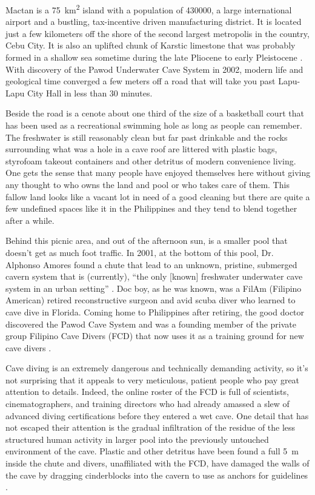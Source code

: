 
Mactan is a \SI{75}{\kilo\metre\squared} island with a population of \num{430000}, a large international airport and a bustling, tax-incentive driven manufacturing district. It is located just a few kilometers off the shore of the second largest metropolis in the country, Cebu City. 
It is also an uplifted chunk of Karstic limestone that was probably formed in a shallow sea sometime during the late Pliocene to early Pleistocene \parencite{Aleta_2003}. With discovery of the Pawod Underwater Cave System in 2002, modern life and geological time converged a few meters off a road that will take you past Lapu-Lapu City Hall in less than 30 minutes.

Beside the road is a cenote about one third of the size of a basketball court that has been used as a recreational swimming hole as long as people can remember. The freshwater is still reasonably clean but far past drinkable and the rocks surrounding what was a hole in a cave roof are littered with plastic bags, styrofoam takeout containers and other detritus of modern convenience living. One gets the sense that many people have enjoyed themselves here without giving any thought to who owns the land and pool or who takes care of them. This fallow land looks like a vacant lot in need of a good cleaning but there are quite a few undefined spaces like it in the Philippines and they tend to blend together after a while. 

Behind this picnic area, and out of the afternoon sun, is a smaller pool that doesn’t get as much foot traffic.  In 2001, at the bottom of this pool, Dr. Alphonso Amores found a chute that lead to an unknown, pristine, submerged cavern system that is (currently), “the only [known] freshwater underwater cave system in an urban setting” \parencite{Ta-as_2014}. 
Doc boy, as he was known, was a FilAm (Filipino American) retired reconstructive surgeon and avid scuba diver who learned to cave dive in Florida. Coming home to Philippines after retiring, the good doctor discovered the Pawod Cave System and was a founding member of the private group Filipino Cave Divers (FCD) that now uses it as a training ground for new cave divers \parencite{Divers_2014b}. 

Cave diving is an extremely dangerous and technically demanding activity, so it’s not surprising that it appeals to very meticulous, patient people who pay great attention to details. Indeed, the online roster of the FCD is full of scientists, cinematographers, and training directors who had already amassed a slew of advanced diving certifications before they entered a wet cave. One detail that has not escaped their attention is the gradual infiltration of the residue of the less structured human activity in larger pool into the previously untouched environment of the cave. Plastic and other detritus have been found a full \SI{5}{\metre} inside the chute and divers, unaffiliated with the FCD, have damaged the walls of the cave by dragging cinderblocks into the cavern to use as anchors for guidelines \parencite{Divers_2014a}.

